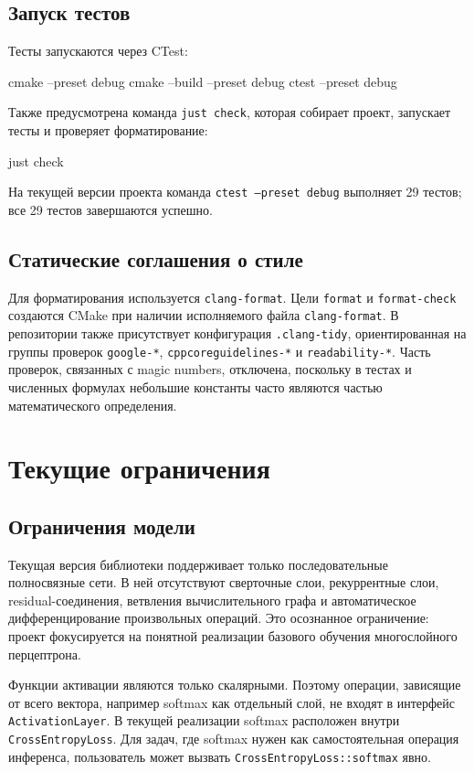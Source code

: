 \documentclass{article}
\begin{document}
\subsection{Запуск тестов}

Тесты запускаются через CTest:
\begin{cppcode}
cmake --preset debug
cmake --build --preset debug
ctest --preset debug
\end{cppcode}
Также предусмотрена команда \texttt{just check}, которая собирает
проект, запускает тесты и проверяет форматирование:
\begin{cppcode}
just check
\end{cppcode}
На текущей версии проекта команда \texttt{ctest --preset debug}
выполняет 29 тестов; все 29 тестов завершаются успешно.

\subsection{Статические соглашения о стиле}

Для форматирования используется \texttt{clang-format}. Цели
\texttt{format} и \texttt{format-check} создаются CMake при наличии
исполняемого файла \texttt{clang-format}. В репозитории также
присутствует конфигурация \texttt{.clang-tidy}, ориентированная на
группы проверок \texttt{google-*}, \texttt{cppcoreguidelines-*} и
\texttt{readability-*}. Часть проверок, связанных с magic numbers,
отключена, поскольку в тестах и численных формулах небольшие константы
часто являются частью математического определения.

\section{Текущие ограничения}

\subsection{Ограничения модели}

Текущая версия библиотеки поддерживает только последовательные
полносвязные сети. В ней отсутствуют сверточные слои, рекуррентные
слои, residual-соединения, ветвления вычислительного графа и
автоматическое дифференцирование произвольных операций. Это осознанное
ограничение: проект фокусируется на понятной реализации базового
обучения многослойного перцептрона.

Функции активации являются только скалярными. Поэтому операции,
зависящие от всего вектора, например softmax как отдельный слой, не
входят в интерфейс \texttt{ActivationLayer}. В текущей реализации
softmax расположен внутри \texttt{CrossEntropyLoss}. Для задач, где
softmax нужен как самостоятельная операция инференса, пользователь
может вызвать \texttt{CrossEntropyLoss::softmax} явно.
\end{document}
